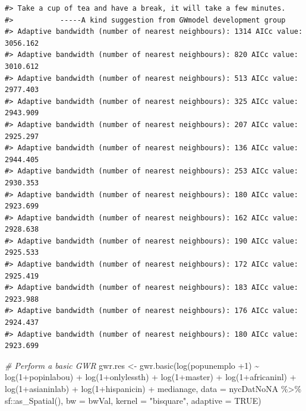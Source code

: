 \documentclass[
  11pt,
]{book}
\newenvironment{Shaded}{\begin{snugshade}}{\end{snugshade}}
\newcommand{\AttributeTok}[1]{\textcolor[rgb]{0.77,0.63,0.00}{#1}}
\newcommand{\CommentTok}[1]{\textcolor[rgb]{0.56,0.35,0.01}{\textit{#1}}}
\newcommand{\ConstantTok}[1]{\textcolor[rgb]{0.00,0.00,0.00}{#1}}
\newcommand{\DecValTok}[1]{\textcolor[rgb]{0.00,0.00,0.81}{#1}}
\newcommand{\FunctionTok}[1]{\textcolor[rgb]{0.00,0.00,0.00}{#1}}
\newcommand{\NormalTok}[1]{#1}
\newcommand{\OtherTok}[1]{\textcolor[rgb]{0.56,0.35,0.01}{#1}}
\newcommand{\SpecialCharTok}[1]{\textcolor[rgb]{0.00,0.00,0.00}{#1}}
\newcommand{\StringTok}[1]{\textcolor[rgb]{0.31,0.60,0.02}{#1}}
\begin{document}
\begin{verbatim}
#> Take a cup of tea and have a break, it will take a few minutes.
#>           -----A kind suggestion from GWmodel development group
#> Adaptive bandwidth (number of nearest neighbours): 1314 AICc value: 3056.162 
#> Adaptive bandwidth (number of nearest neighbours): 820 AICc value: 3010.612 
#> Adaptive bandwidth (number of nearest neighbours): 513 AICc value: 2977.403 
#> Adaptive bandwidth (number of nearest neighbours): 325 AICc value: 2943.909 
#> Adaptive bandwidth (number of nearest neighbours): 207 AICc value: 2925.297 
#> Adaptive bandwidth (number of nearest neighbours): 136 AICc value: 2944.405 
#> Adaptive bandwidth (number of nearest neighbours): 253 AICc value: 2930.353 
#> Adaptive bandwidth (number of nearest neighbours): 180 AICc value: 2923.699 
#> Adaptive bandwidth (number of nearest neighbours): 162 AICc value: 2928.638 
#> Adaptive bandwidth (number of nearest neighbours): 190 AICc value: 2925.533 
#> Adaptive bandwidth (number of nearest neighbours): 172 AICc value: 2925.419 
#> Adaptive bandwidth (number of nearest neighbours): 183 AICc value: 2923.988 
#> Adaptive bandwidth (number of nearest neighbours): 176 AICc value: 2924.437 
#> Adaptive bandwidth (number of nearest neighbours): 180 AICc value: 2923.699
\end{verbatim}

\begin{Shaded}
\begin{Highlighting}[]
\CommentTok{\# Perform a basic GWR}
\NormalTok{gwr.res }\OtherTok{\textless{}{-}} \FunctionTok{gwr.basic}\NormalTok{(}\FunctionTok{log}\NormalTok{(popunemplo }\SpecialCharTok{+}\DecValTok{1}\NormalTok{) }\SpecialCharTok{\textasciitilde{}} \FunctionTok{log}\NormalTok{(}\DecValTok{1}\SpecialCharTok{+}\NormalTok{popinlabou) }\SpecialCharTok{+}
                           \FunctionTok{log}\NormalTok{(}\DecValTok{1}\SpecialCharTok{+}\NormalTok{onlylessth) }\SpecialCharTok{+} \FunctionTok{log}\NormalTok{(}\DecValTok{1}\SpecialCharTok{+}\NormalTok{master) }\SpecialCharTok{+} 
                           \FunctionTok{log}\NormalTok{(}\DecValTok{1}\SpecialCharTok{+}\NormalTok{africaninl) }\SpecialCharTok{+} \FunctionTok{log}\NormalTok{(}\DecValTok{1}\SpecialCharTok{+}\NormalTok{asianinlab) }\SpecialCharTok{+} 
                           \FunctionTok{log}\NormalTok{(}\DecValTok{1}\SpecialCharTok{+}\NormalTok{hispanicin) }\SpecialCharTok{+}\NormalTok{ medianage,}
                         \AttributeTok{data =}\NormalTok{ nycDatNoNA }\SpecialCharTok{\%\textgreater{}\%}\NormalTok{ sf}\SpecialCharTok{::}\FunctionTok{as\_Spatial}\NormalTok{(), }
                     \AttributeTok{bw =}\NormalTok{ bwVal, }\AttributeTok{kernel =} \StringTok{"bisquare"}\NormalTok{, }\AttributeTok{adaptive =} \ConstantTok{TRUE}\NormalTok{)}
\end{Highlighting}
\end{Shaded}
\end{document}
